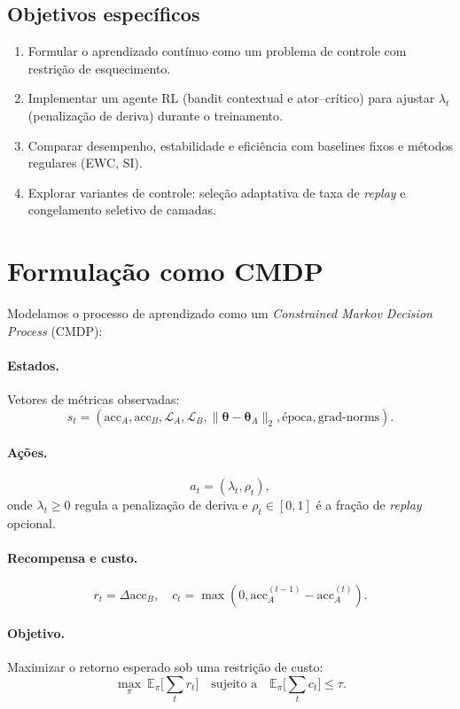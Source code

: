 \documentclass[9pt,a4paper]{extarticle}
\begin{document}
\subsection*{Objetivos específicos}
\begin{enumerate}
    \item Formular o aprendizado contínuo como um problema de controle com restrição de esquecimento.
    \item Implementar um agente RL (bandit contextual e ator–crítico) para ajustar $\lambda_t$ (penalização de deriva) durante o treinamento.
    \item Comparar desempenho, estabilidade e eficiência com baselines fixos e métodos regulares (EWC, SI).
    \item Explorar variantes de controle: seleção adaptativa de taxa de \textit{replay} e congelamento seletivo de camadas.
\end{enumerate}

\section{Formulação como CMDP}
Modelamos o processo de aprendizado como um \textit{Constrained Markov Decision Process} (CMDP):

\paragraph{Estados.} Vetores de métricas observadas: 
\[
s_t = (\mathrm{acc}_A, \mathrm{acc}_B, \mathcal{L}_A, \mathcal{L}_B, \|\bm{\theta}-\bm{\theta}_A\|_2, \text{época}, \text{grad-norms}).
\]

\paragraph{Ações.} 
\[
a_t = (\lambda_t, \rho_t),
\]
onde $\lambda_t \ge 0$ regula a penalização de deriva e $\rho_t \in [0,1]$ é a fração de \textit{replay} opcional.

\paragraph{Recompensa e custo.}
\[
r_t = \Delta \mathrm{acc}_B, \quad c_t = \max(0,\mathrm{acc}_A^{(t-1)} - \mathrm{acc}_A^{(t)}).
\]

\paragraph{Objetivo.}
Maximizar o retorno esperado sob uma restrição de custo:
\[
\max_\pi \ \mathbb{E}_\pi\!\Big[\sum_t r_t\Big]
\quad \text{sujeito a} \quad
\mathbb{E}_\pi\!\Big[\sum_t c_t\Big] \le \tau.
\]
\end{document}
